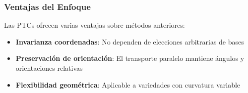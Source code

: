 \subsubsection{Ventajas del Enfoque}

Las PTCs ofrecen varias ventajas sobre métodos anteriores:

\begin{itemize}
    \item \textbf{Invarianza coordenadas}: No dependen de elecciones arbitrarias de bases
    \item \textbf{Preservación de orientación}: El transporte paralelo mantiene ángulos y orientaciones relativas
    \item \textbf{Flexibilidad geométrica}: Aplicable a variedades con curvatura variable
\end{itemize}

